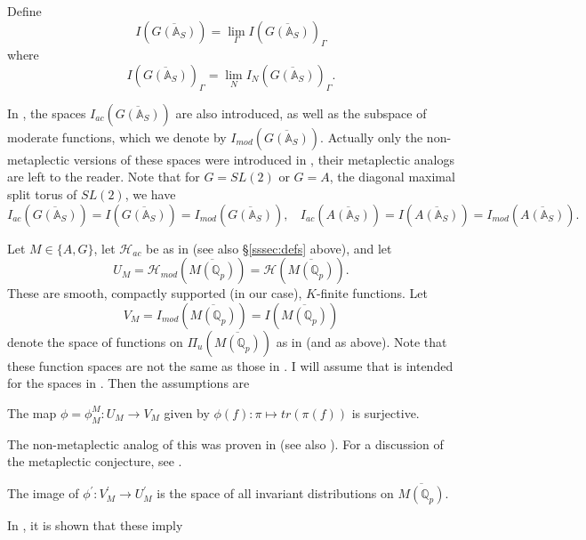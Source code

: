 Define
\begin{equation}\label{eq:6.9}
I(\overline{G({\mathbb{A}}_S)})
=\lim_{\Gamma}
I(\overline{G({\mathbb{A}}_S)})_\Gamma
\end{equation}
where
\[
I(\overline{G({\mathbb{A}}_S)})_\Gamma
=\lim_N
I_N(\overline{G({\mathbb{A}}_S)})_\Gamma .
\]

In \cite{A11}, the spaces $I_{ac}(\overline{G({\mathbb{A}}_S)})$ are also
introduced, as well as the subspace of moderate functions,
which we denote by $I_{mod}(\overline{G({\mathbb{A}}_S)})$.
Actually only the non-metaplectic versions of these spaces
were introduced in \cite{A11}, their metaplectic analogs are left
to the reader.
Note that for $G=SL(2)$ or $G=A$, the diagonal maximal split torus
of $SL(2)$, we have
\[
I_{ac}(\overline{G({\mathbb{A}}_S)})=I(\overline{G({\mathbb{A}}_S)})
=I_{mod}(\overline{G({\mathbb{A}}_S)}),
\ \ \ \ 
I_{ac}(\overline{A({\mathbb{A}}_S)})
=I(\overline{A({\mathbb{A}}_S)})
=I_{mod}(\overline{A({\mathbb{A}}_S)}).
\]

Let $M\in \{A,G\}$, let ${\mathcal{H}}_{ac}$ be as in
\cite{A11} (see also \S\ref{sssec:defs} above),
and let 
\[
U_M={\mathcal{H}}_{mod}(\overline{M({\mathbb{Q}}_p)})
={\mathcal{H}}(\overline{M({\mathbb{Q}}_p)}) .
\]
These are smooth, compactly supported (in our case), $K$-finite
functions. Let 
\[
V_M=I_{mod}(\overline{M({\mathbb{Q}}_p)}) =I(\overline{M({\mathbb{Q}}_p)})
\]
denote the space of functions on $\Pi _u(\overline{M({\mathbb{Q}}_p)})$ as
in \cite{A11} (and as above).
Note that these function spaces are not the same as those in \cite{A6}.
I will assume that \cite[Assumption 5.1]{A6} is intended
for the spaces in \cite[section 11]{A11}.
Then the assumptions are

\begin{conjecture}\label{conj:6.3}
The map $\phi=\phi_M^M :U_M\rightarrow V_M$ given by
$\phi (f):\pi \longmapsto tr(\pi (f)) $ is surjective.
\end{conjecture}

The non-metaplectic analog of this
was proven in \cite[Lemma 6.1]{A10} (see also \cite{BDK}).
For a discussion of the metaplectic conjecture, see \cite{J1}.

\begin{conjecture}\label{conj:6.4}
The image of $\phi ^{\prime }:V_M^{\prime }\rightarrow U_M^{\prime }$ is the
space of all invariant distributions on
$\overline{M({\mathbb {Q}}_p)}$.
\end{conjecture}

In \cite[Lemma 8.3, Theorem 12.1]{A6}, it is shown that these imply

